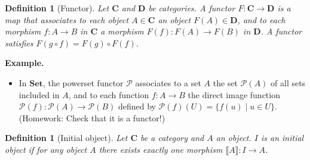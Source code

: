 \documentclass[11pt,a4paper]{article}
\newtheorem{defi}[theo]{Definition}
\newcommand{\itemz}{\item[$\triangleright$]}
\newcommand{\gr}{\textbf}
\newcommand{\lb}{\llbracket}
\newcommand{\rb}{\rrbracket}
\newcommand{\1}{\mathbbm{1}}
\renewcommand{\P}{\mathcal{P}}
\begin{document}
\begin{defi}[Functor] Let $\gr{C}$ and $\gr{D}$ be categories. A functor $F : \gr{C} \to \gr{D}$ is a map that associates to each object $A \in \gr{C}$ an object $F(A) \in \gr{D}$, and to each morphism $f : A \to B$ in $\gr{C}$ a morphism $F(f) : F(A) \to F(B)$ in $\gr{D}$. A functor satisfies $F(g \circ f) = F(g) \circ F(f)$.
\end{defi}
\begin{center}
\end{center}

\gr{Example.} \begin{itemize}
\itemz In $\gr{Set}$, the powerset functor $\P$ associates to a set $A$ the set $\P(A)$ of all sets included in $A$, and to each function $f : A \to B$ the direct image function $\P(f) : \P(A) \to \P(B)$ defined by $\P(f)(U) = \{ f(u) \mid u \in U \}$. (Homework: Check that it is a functor!)
\end{itemize}
\begin{defi}[Initial object]
Let $\gr{C}$ be a category and $A$ an object. $I$ is an initial object if for any object $A$ there exists exactly one morphism $\lb A \rb : I \to A$.
\end{defi}
\newpage
\end{document}
